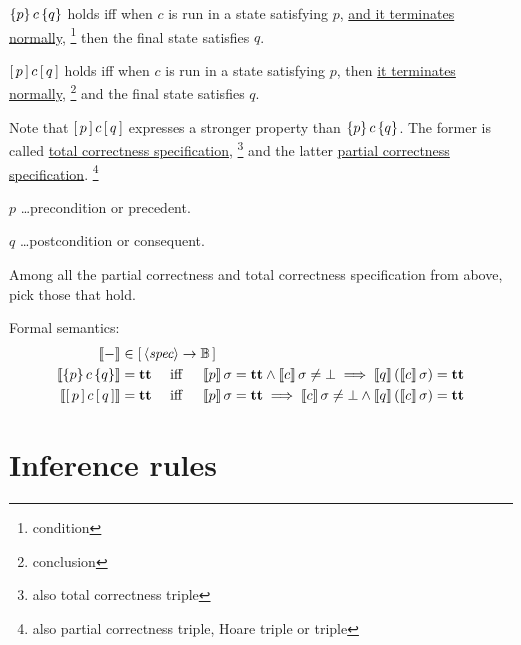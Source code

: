 \begin{enumcirc}
\begin{enumrm}
		$\left\{ p \right\} c \left\{ q \right\}$ holds iff when $c$ is run in a state satisfying $p$,
		\ul{and it terminates normally}, \footnote{condition} then the final state satisfies $q$.
		\item
		$\left[ \, p \, \right] c \left[ \, q \, \right]$ holds iff when $c$ is run in a state satisfying $p$,
		then \ul{it terminates normally}, \footnote{conclusion} and the final state satisfies $q$.
	\end{enumrm}
	Note that $\left[ \, p \, \right] c \left[ \, q \, \right]$ expresses a stronger property than
	$\left\{ p \right\} c \left\{ q \right\}$.
	The former is called \ul{total correctness specification}, \footnote{also total
		correctness triple} and the latter \ul{partial correctness specification}.
	\footnote{also partial correctness triple, Hoare triple or triple}

	$p$ \dots precondition or precedent.

	$q$ \dots postcondition or consequent.

	\begin{exercise}
		Among all the partial correctness and total correctness specification from
		above, pick those that hold.
	\end{exercise}
	\item
	Formal semantics:
	\begin{align*}
		\left\llbracket - \right\rrbracket                           & \in \left[ \, \left\langle \textit{spec} \right\rangle \to \mathbb{B} \, \right] \\
		\left\llbracket \left\{ p \right\} c \left\{ q \right\} \right\rrbracket     & = \textbf{tt} \quad \textrm{ iff } \quad
		\left\llbracket p \right\rrbracket \sigma = \textbf{tt} \wedge \left\llbracket c \right\rrbracket \sigma \neq \bot \implies
		\left\llbracket q \right\rrbracket \left( \left\llbracket c \right\rrbracket \sigma \right) = \textbf{tt}                           \\
		\left\llbracket \left[ \, p \, \right] c \left[ \, q \, \right] \right\rrbracket & = \textbf{tt} \quad \textrm{ iff } \quad
		\left\llbracket p \right\rrbracket \sigma = \textbf{tt} \implies \left\llbracket c \right\rrbracket \sigma \neq \bot \wedge
		\left\llbracket q \right\rrbracket \left( \left\llbracket c \right\rrbracket \sigma \right) = \textbf{tt}
	\end{align*}
\end{enumcirc}

\section{Inference rules}

